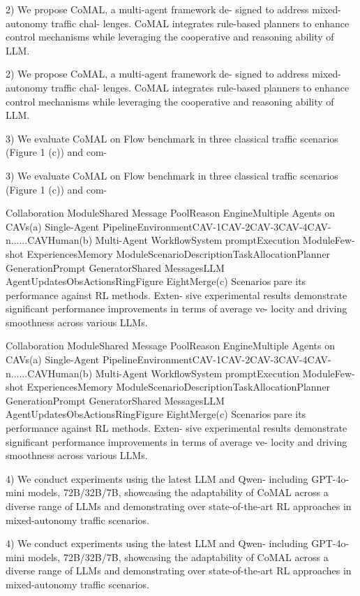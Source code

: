 \documentclass[12pt]{article}
\begin{document}
2) We propose CoMAL, a multi-agent framework de-
signed to address mixed-autonomy traffic chal-
lenges. CoMAL integrates rule-based planners to
enhance control mechanisms while leveraging the
cooperative and reasoning ability of LLM.


2) We propose CoMAL, a multi-agent framework de-
signed to address mixed-autonomy traffic chal-
lenges. CoMAL integrates rule-based planners to
enhance control mechanisms while leveraging the
cooperative and reasoning ability of LLM.


3) We evaluate CoMAL on Flow benchmark in three
classical traffic scenarios (Figure 1 (c)) and com-


3) We evaluate CoMAL on Flow benchmark in three
classical traffic scenarios (Figure 1 (c)) and com-


Collaboration ModuleShared Message PoolReason EngineMultiple Agents on CAVs(a) Single-Agent PipelineEnvironmentCAV-1CAV-2CAV-3CAV-4CAV-n......CAVHuman(b) Multi-Agent WorkflowSystem promptExecution ModuleFew-shot ExperiencesMemory ModuleScenarioDescriptionTaskAllocationPlanner GenerationPrompt GeneratorShared MessagesLLM AgentUpdatesObsActionsRingFigure EightMerge(c) Scenariospare its performance against RL methods. Exten-
sive experimental results demonstrate significant
performance improvements in terms of average ve-
locity and driving smoothness across various LLMs.


Collaboration ModuleShared Message PoolReason EngineMultiple Agents on CAVs(a) Single-Agent PipelineEnvironmentCAV-1CAV-2CAV-3CAV-4CAV-n......CAVHuman(b) Multi-Agent WorkflowSystem promptExecution ModuleFew-shot ExperiencesMemory ModuleScenarioDescriptionTaskAllocationPlanner GenerationPrompt GeneratorShared MessagesLLM AgentUpdatesObsActionsRingFigure EightMerge(c) Scenariospare its performance against RL methods. Exten-
sive experimental results demonstrate significant
performance improvements in terms of average ve-
locity and driving smoothness across various LLMs.


4) We conduct experiments using the latest LLM
and Qwen-
including GPT-4o-mini
models,
72B/32B/7B,
showcasing the adaptability of
CoMAL across a diverse range of LLMs and
demonstrating
over
state-of-the-art RL approaches in mixed-autonomy
traffic scenarios.


4) We conduct experiments using the latest LLM
and Qwen-
including GPT-4o-mini
models,
72B/32B/7B,
showcasing the adaptability of
CoMAL across a diverse range of LLMs and
demonstrating
over
state-of-the-art RL approaches in mixed-autonomy
traffic scenarios.
\end{document}
